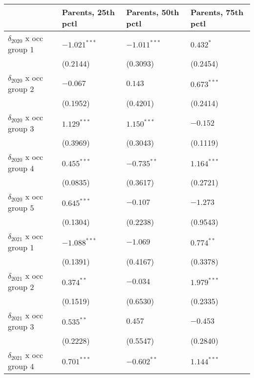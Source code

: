 \begin{tabular}{llll}
\toprule
{} & Parents, 25th pctl & Parents, 50th pctl & Parents, 75th pctl \\
\midrule
$\delta_{2020}$ x occ group 1          &     $-1.021^{***}$ &     $-1.011^{***}$ &          $0.432^*$ \\
                                       &           (0.2144) &           (0.3093) &           (0.2454) \\
$\delta_{2020}$ x occ group 2          &           $-0.067$ &            $0.143$ &      $0.673^{***}$ \\
                                       &           (0.1952) &           (0.4201) &           (0.2414) \\
$\delta_{2020}$ x occ group 3          &      $1.129^{***}$ &      $1.150^{***}$ &           $-0.152$ \\
                                       &           (0.3969) &           (0.3043) &           (0.1119) \\
$\delta_{2020}$ x occ group 4          &      $0.455^{***}$ &      $-0.735^{**}$ &      $1.164^{***}$ \\
                                       &           (0.0835) &           (0.3617) &           (0.2721) \\
$\delta_{2020}$ x occ group 5          &      $0.645^{***}$ &           $-0.107$ &           $-1.273$ \\
                                       &           (0.1304) &           (0.2238) &           (0.9543) \\
$\delta_{2021}$ x occ group 1          &     $-1.088^{***}$ &           $-1.069$ &       $0.774^{**}$ \\
                                       &           (0.1391) &           (0.4167) &           (0.3378) \\
$\delta_{2021}$ x occ group 2          &       $0.374^{**}$ &           $-0.034$ &      $1.979^{***}$ \\
                                       &           (0.1519) &           (0.6530) &           (0.2335) \\
$\delta_{2021}$ x occ group 3          &       $0.535^{**}$ &            $0.457$ &           $-0.453$ \\
                                       &           (0.2228) &           (0.5547) &           (0.2840) \\
$\delta_{2021}$ x occ group 4          &      $0.701^{***}$ &      $-0.602^{**}$ &      $1.144^{***}$ \\

\end{tabular}

